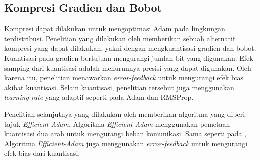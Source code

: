 \subsection{Kompresi Gradien dan Bobot}
Kompresi dapat dilakukan untuk mengoptimasi Adam pada lingkungan terdistribusi. Penelitian yang dilakukan oleh \textcite{Chen2021CADA} memberikan sebuah alternatif kompresi yang dapat dilakukan, yakni dengan mengkuantisasi gradien dan bobot. Kuantisasi pada gradien bertujuan mengurangi jumlah bit yang digunakan. Efek samping dari kuantisasi adalah menurunnya presisi yang dapat digunakan. Oleh karena itu, penelitian \textcite{Chen2021CADA} menawarkan \emph{error-feedback} untuk mengurangi efek bias akibat kuantisasi. Selain kuantisasi, penelitian tersebut juga menggunakan \emph{learning rate} yang adaptif seperti pada Adam dan RMSProp.

Penelitian selanjutnya yang dilakukan oleh \textcite{Chen2022Efficient} memberikan algoritma yang diberi tajuk \emph{Efficient-Adam}. Algoritma \emph{Efficient-Adam} menggunakan pemetaan kuantisasi dua arah untuk mengurangi beban komunikasi. Sama seperti pada \textcite{Chen2021CADA}, Algoritma \emph{Efficient-Adam} juga menggunakan \emph{error-feedback} untuk mengurangi efek bias dari kuantisasi.
